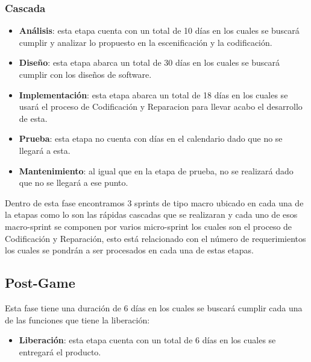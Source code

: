 \subsubsection{Cascada}
\begin{itemize}
	\item \textbf{Análisis}: esta etapa cuenta con  un total de 10 días en los cuales se buscará cumplir y analizar lo propuesto en la escenificación y la codificación.
	\item \textbf{Diseño}: esta etapa abarca un total de 30 días en los cuales se buscará cumplir con los diseños de software.
	\item \textbf{Implementación}: esta etapa abarca un total de 18 días en los cuales se usará el proceso de Codificación y Reparacion para llevar acabo el desarrollo de esta.
	\item \textbf{Prueba}: esta etapa no cuenta con días en el calendario dado que no se llegará a esta.
	\item \textbf{Mantenimiento}: al igual que en la etapa de prueba, no se realizará dado que no se llegará a ese punto.
	
	
	
	
\end{itemize}

Dentro de esta fase encontramos 3 sprints de tipo macro ubicado en cada una de la etapas como lo son las rápidas cascadas que se realizaran y cada uno de esos macro-sprint se componen por varios micro-sprint los cuales son el proceso de Codificación y Reparación, esto está relacionado con el número de requerimientos los cuales se pondrán a ser procesados en cada una de estas etapas.

\subsection{Post-Game}
Esta fase tiene una duración de 6 días en los cuales se buscará cumplir cada una de las funciones que tiene la liberación:
\begin{itemize}
	\item \textbf{Liberación}: esta etapa cuenta con un total de 6 días en los cuales se entregará el producto.
\end{itemize}
	

